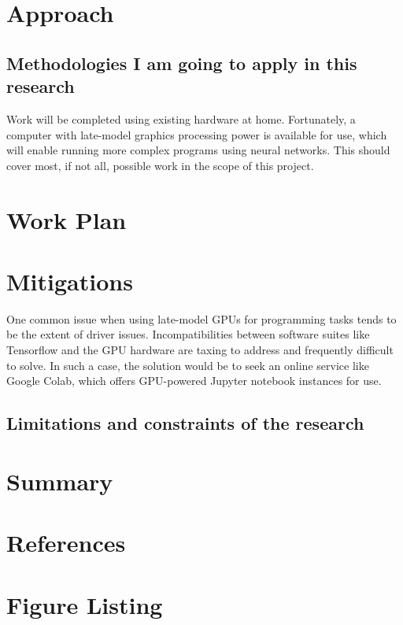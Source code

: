 \documentclass{article}
\newcommand{\nocontentsline}[3]{}
\newcommand{\tocless}[2]{\bgroup\let\addcontentsline=\nocontentsline#1{#2}\egroup}
\begin{document}
  \section{Approach}
  \tocless\subsection{Methodologies I am going to apply in this research}
  \tocless\subsection{Techniques I am going to use to solve the problem}
  \tocless\subsection{Processes I am going to engage in this research}
  \tocless\subsection{Facilities and supplies needed for this research}
  Work will be completed using existing hardware at home.
  Fortunately, a computer with late-model graphics processing power is available for use, which will enable running more complex programs using neural networks.
  This should cover most, if not all, possible work in the scope of this project.
  \newpage
  \section{Work Plan}
  \tocless\subsection{Tasks to be performed in this research}
  \tocless\subsection{Schedule, timeline, and milestones}
  \newpage
  \section{Mitigations}
  \tocless\subsection{Anticipated problems and issues}
  One common issue when using late-model GPUs for programming tasks tends to be the extent of driver issues.
  Incompatibilities between software suites like Tensorflow and the GPU hardware are taxing to address and frequently difficult to solve.
  In such a case, the solution would be to seek an online service like Google Colab, which offers GPU-powered Jupyter notebook instances for use.
  \tocless\subsection{Limitations and constraints of the research}
  \newpage
  \section{Summary}
  \newpage
  \section{References}
  
  \newpage
  \appendix
  \section{Figure Listing}
\end{document}
